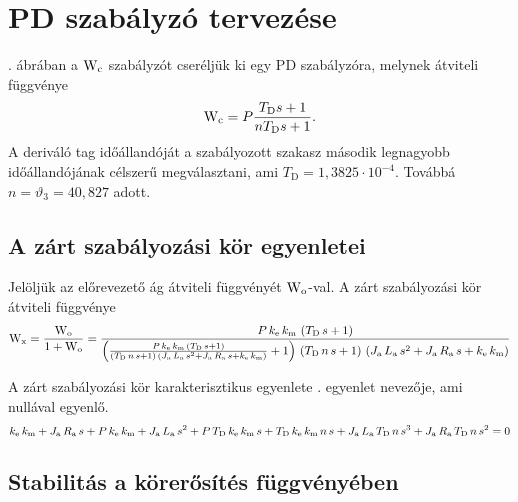 \section{PD szabályzó tervezése}


. ábrában a $\mathrm{W}_\text{c}$ szabályzót cseréljük ki
egy PD szabályzóra, melynek átviteli függvénye
\begin{equation}
	\mathrm{W}_\text{c} = P\frac{T_\text{D}s+1}{nT_\text{D}s+1}.
\end{equation}
A deriváló tag időállandóját a szabályozott szakasz második legnagyobb időállandójának
célszerű megválasztani, ami $T_\text{D} = 1,3825\cdot 10^{-4}$.
Továbbá $n=\vartheta_3=40,827$ adott.


\subsection{A zárt szabályozási kör egyenletei}

Jelöljük az előrevezető ág átviteli függvényét $\mathrm{W}_\text{o}$-val.
A zárt szabályozási kör átviteli függvénye
\begin{equation}\label{eq:W-x}
	\mathrm{W}_\text{x} = \frac{\mathrm{W}_\text{o}}{1 + \mathrm{W}_\text{o}} =
	\frac{P\, k_\text{e}\, k_\text{m}\, \left(T_\text{D}\, s + 1\right)}{\left(\frac{P\, k_\text{e}\, k_\text{m}\, \left(T_\text{D}\, s + 1\right)}{\left(T_\text{D}\, n\, s + 1\right)\, \left(J_\text{a}\, L_\text{a}\, s^2 + J_\text{a}\, R_\text{a}\, s + k_\text{e}\, k_\text{m}\right)} + 1\right)\, \left(T_\text{D}\, n\, s + 1\right)\, \left(J_\text{a}\, L_\text{a}\, s^2 + J_\text{a}\, R_\text{a}\, s + k_\text{e}\, k_\text{m}\right)}
\end{equation}

A zárt szabályozási kör karakterisztikus egyenlete . egyenlet nevezője,
ami nullával egyenlő.
\begin{equation}
	k_\text{e}\, k_\text{m} + J_\text{a}\, R_\text{a}\, s + P\, k_\text{e}\, k_\text{m} + J_\text{a}\, L_\text{a}\, s^2 + P\, T_\text{D}\, k_\text{e}\, k_\text{m}\, s + T_\text{D}\, k_\text{e}\, k_\text{m}\, n\, s + J_\text{a}\, L_\text{a}\, T_\text{D}\, n\, s^3 + J_\text{a}\, R_\text{a}\, T_\text{D}\, n\, s^2 = 0
\end{equation}

\subsection{Stabilitás a körerősítés függvényében}

